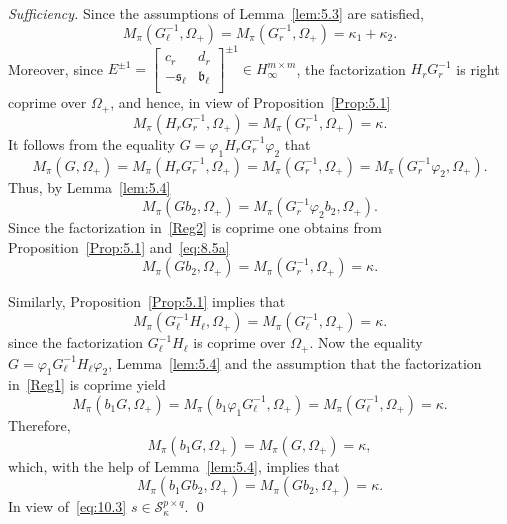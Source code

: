 \documentclass[12pt,twoside,a4paper]{amsart}
\theoremstyle{definition}
\numberwithin{equation}{section}
\begin{document}
{\it Sufficiency.}
Since the assumptions of Lemma~\ref{lem:5.3} are satisfied,
\begin{equation}\label{eq:8.5a}
M_\pi(G_\ell^{-1},\Omega_+)=
M_\pi(G_r^{-1},\Omega_+)=\kappa_1+\kappa_2.
\end{equation}
Moreover, since  $E^{\pm 1}=\left[\begin{array}{cc}
                                        c_r & d_r \\
                                   -{{\mathfrak s}}_\ell & {{\mathfrak b}}_\ell \\
                        \end{array}\right]^{\pm 1}\in H_\infty^{m\times m}$,
the factorization $H_rG_r^{-1}$
is right coprime over $\Omega_+$, and hence, in view of
Proposition~\ref{Prop:5.1}
\[
M_\pi(H_rG_r^{-1},\Omega_+)= M_\pi(G_r^{-1},\Omega_+)=\kappa.
\]
It follows from the equality $ G=\varphi_1 H_rG_r^{-1}\varphi_2$
that
\[
M_\pi(G,\Omega_+)=M_\pi(H_rG_r^{-1},\Omega_+)=
M_\pi(G_r^{-1},\Omega_+)= M_\pi(G_r^{-1}\varphi_2,\Omega_+).
\]
Thus, by Lemma~\ref{lem:5.4}
\[
M_\pi(Gb_2,\Omega_+)= M_\pi(G_r^{-1}\varphi_2b_2,\Omega_+).
\]
Since the factorization in~\eqref{Reg2} is coprime one obtains from
Proposition~\ref{Prop:5.1} and~\eqref{eq:8.5a}
\[
M_\pi(Gb_2,\Omega_+)= M_\pi(G_r^{-1},\Omega_+)=\kappa.
\]

Similarly, Proposition~\ref{Prop:5.1} implies that
\[
M_\pi(G_\ell^{-1}H_\ell,\Omega_+)=M_\pi(G_\ell^{-1},\Omega_+)=\kappa.
\]
since the factorization $G_\ell^{-1}H_\ell$ is coprime over $\Omega_+$.
Now the equality $ G=\varphi_1 G_\ell^{-1}H_\ell\varphi_2$,
Lemma~\ref{lem:5.4} and the assumption that the factorization
in~\eqref{Reg1} is coprime yield
\[
M_\pi(b_1G,\Omega_+)=
M_\pi(b_1\varphi_1G_\ell^{-1},\Omega_+)=M_\pi(G_\ell^{-1},\Omega_+)=\kappa.
\]
Therefore,
\[
M_\pi(b_1G,\Omega_+)=M_\pi(G,\Omega_+)=\kappa,
\]
which, with the help of Lemma~\ref{lem:5.4}, implies that
\[
M_\pi(b_1Gb_2,\Omega_+)=M_\pi(Gb_2,\Omega_+)=\kappa.
\]
In view of~\eqref{eq:10.3} $s\in {\mathcal S}_{\kappa}^{p\times q}$.
\hfill \qed
\end{document}
